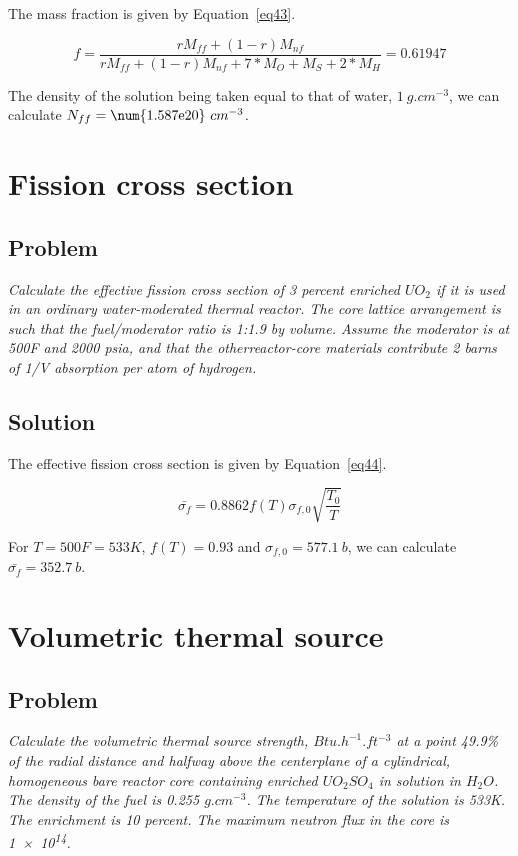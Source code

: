 The mass fraction is given by Equation~\ref{eq43}.


\begin{equation}\label{eq43}
f = \frac{rM_{ff} + (1-r)M_{nf}}{rM_{ff} + (1-r)M_{nf} + 7*M_{O} + M_S + 2*M_{H}} = 0.61947
\end{equation}

The density of the solution being taken equal to that of water, $1\ g.cm^{-3}$, we can calculate $N_{ff} = \text{\num{1.587e20}}\ cm^{-3}$.

\section{Fission cross section}
\label{prob42}

\subsection{Problem}
\textit{Calculate the effective fission cross section of 3 percent enriched $UO_2$ if it is used in an ordinary water-moderated thermal reactor. The core lattice arrangement is such that the fuel/moderator ratio is 1:1.9 by volume. Assume the moderator is at 500F and 2000 psia, and that the otherreactor-core materials contribute 2 barns of 1/V absorption per atom of hydrogen.}

\subsection{Solution}

The effective fission cross section is given by Equation~\ref{eq44}.


\begin{equation}\label{eq44}
\bar{\sigma_{f}} = 0.8862 f(T) \sigma_{f,0} \sqrt{\frac{T_0}{T}}
\end{equation}

For $T = 500 F = 533 K$, $f(T) = 0.93$ and $\sigma_{f, 0} = 577.1\ b$, we can calculate $\bar{\sigma_f} = 352.7\ b$.


\section{Volumetric thermal source}
\label{prob43}

\subsection{Problem}
\textit{Calculate the volumetric thermal source strength, $Btu.h^{-1}.ft^{-3}$ at a point 49.9\% of the radial distance and halfway above the centerplane of a cylindrical, homogeneous bare reactor core containing enriched $UO_2SO_4$ in solution in $H_2O$. The density of the fuel is 0.255 $g.cm^{-3}$. The temperature of the solution is 533K. The enrichment is 10 percent. The maximum neutron flux in the core is \num{1e14}.}

